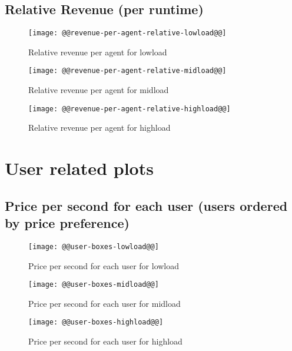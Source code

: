\documentclass[11pt]{article}
\begin{document}
\newpage
\subsection{Relative Revenue (per runtime)}
\begin{figure}[htbp]
  \begin{center}
    \texttt{[image: @@revenue-per-agent-relative-lowload@@]}
    \caption{Relative revenue per agent for lowload}
    \label{fig:revenue-per-agent-relative-lowload}
  \end{center}
\end{figure}
\begin{figure}[htbp]
  \begin{center}
    \texttt{[image: @@revenue-per-agent-relative-midload@@]}
    \caption{Relative revenue per agent for midload}
    \label{fig:revenue-per-agent-relative-midload}
  \end{center}
\end{figure}
\begin{figure}[htbp]
  \begin{center}
    \texttt{[image: @@revenue-per-agent-relative-highload@@]}
    \caption{Relative revenue per agent for highload}
    \label{fig:revenue-per-agent-relative-highload}
  \end{center}
\end{figure}

\newpage
\section{User related plots}
\subsection{Price per second for each user (users ordered by price preference)}
\begin{figure}[htbp]
  \begin{center}
    \texttt{[image: @@user-boxes-lowload@@]}
    \caption{Price per second for each user for lowload}
    \label{fig:user-boxes-lowload}
  \end{center}
\end{figure}
\begin{figure}[htbp]
  \begin{center}
    \texttt{[image: @@user-boxes-midload@@]}
    \caption{Price per second for each user for midload}
    \label{fig:user-boxes-midload}
  \end{center}
\end{figure}
\begin{figure}[htbp]
  \begin{center}
    \texttt{[image: @@user-boxes-highload@@]}
    \caption{Price per second for each user for highload}
    \label{fig:user-boxes-highload}
  \end{center}
\end{figure}
\end{document}
